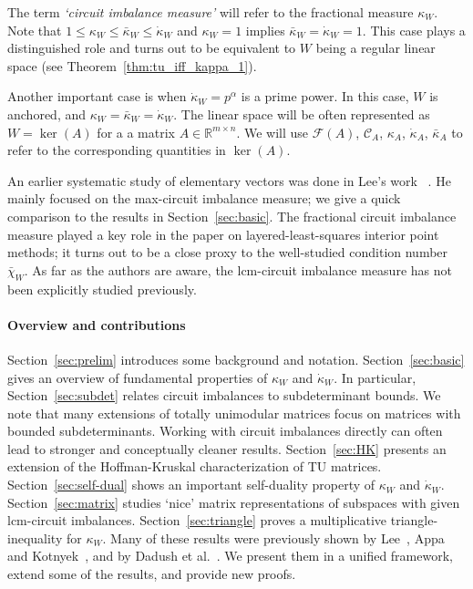 \documentclass[11pt, a4paper]{article}
\newcommand{\Le}{\kappa}
\newcommand{\circuits}{\mathcal{C}}
\newcommand{\1}{\mathbbm{1}}
\newcommand{\kd}{{\dot{\kappa}}}
\newcommand{\EE}{\mathcal F}
\theoremstyle{case}
\newcommand{\R}{\mathbb{R}}
\begin{document}
 The term \emph{`circuit imbalance measure'} will refer to the fractional measure $\kappa_W$.
Note that $1\le \kappa_W\le \bar\kappa_W\le\dot\kappa_W$ and $\kappa_W=1$ implies $\bar\kappa_W=\dot\kappa_W=1$. This case plays a distinguished role and turns out to be equivalent to $W$ being a regular linear space (see Theorem~\ref{thm:tu_iff_kappa_1}).

 Another important case is when $\dot\kappa_W=p^\alpha$ is a prime power. In this case, $W$ is anchored, and  $\kappa_W=\bar\kappa_W=\dot\kappa_W$.
The linear space will be often represented as $W=\ker(A)$ for a 
a matrix $A\in \R^{m\times n}$.
We will use  $\EE(A)$, $\circuits_A$, $\Le_A$, $\kd_A$, $\bar\Le_A$ to refer to the corresponding quantities in $\ker(A)$.

\medskip

An earlier systematic study of elementary vectors was done in
Lee's work ~\cite{Lee89}. He mainly focused on the max-circuit imbalance measure; we give a quick comparison to the results in Section~\ref{sec:basic}. The fractional circuit imbalance measure played a key role in the paper \cite{DHNV20} on layered-least-squares interior point methods; it turns out to be  a close proxy to the well-studied condition number $\bar\chi_W$. As far as the authors are aware, the lcm-circuit imbalance measure has not been explicitly studied previously.

\paragraph{Overview and contributions}
Section~\ref{sec:prelim} introduces some background and notation.
Section~\ref{sec:basic} gives an overview of fundamental properties of $\Le_W$ and $\kd_W$. In particular, Section~\ref{sec:subdet} relates circuit imbalances to subdeterminant bounds. 
We note that many extensions of totally unimodular matrices focus on matrices with bounded subdeterminants. Working with circuit imbalances directly can often lead to stronger and conceptually cleaner results.
Section~\ref{sec:HK} presents an extension of the Hoffman-Kruskal characterization of TU matrices. Section~\ref{sec:self-dual} shows an important self-duality property of $\Le_W$ and $\kd_W$. Section~\ref{sec:matrix} studies `nice' matrix representations of subspaces with given lcm-circuit imbalances.
Section~\ref{sec:triangle} proves a multiplicative triangle-inequality for $\Le_W$. Many of these results were previously shown by Lee~\cite{Lee89}, Appa and Kotnyek~\cite{Appa04}, and by Dadush et al.~\cite{DHNV20}. We present them in a unified framework, extend some of the results, and provide new proofs.
\end{document}
